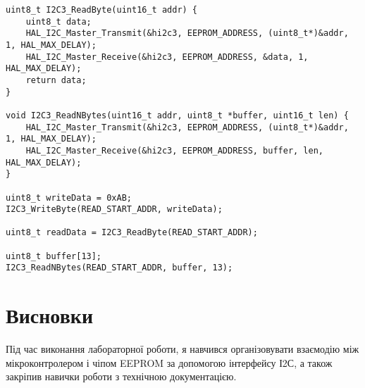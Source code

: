 \documentclass[oneside,14pt]{extarticle}
\begin{document}
\begin{normalsize}
{\begin{lstlisting}
uint8_t I2C3_ReadByte(uint16_t addr) {
    uint8_t data;
    HAL_I2C_Master_Transmit(&hi2c3, EEPROM_ADDRESS, (uint8_t*)&addr, 1, HAL_MAX_DELAY);
    HAL_I2C_Master_Receive(&hi2c3, EEPROM_ADDRESS, &data, 1, HAL_MAX_DELAY);
    return data;
}

void I2C3_ReadNBytes(uint16_t addr, uint8_t *buffer, uint16_t len) {
    HAL_I2C_Master_Transmit(&hi2c3, EEPROM_ADDRESS, (uint8_t*)&addr, 1, HAL_MAX_DELAY);
    HAL_I2C_Master_Receive(&hi2c3, EEPROM_ADDRESS, buffer, len, HAL_MAX_DELAY);
}
	
uint8_t writeData = 0xAB;
I2C3_WriteByte(READ_START_ADDR, writeData);

uint8_t readData = I2C3_ReadByte(READ_START_ADDR);

uint8_t buffer[13];
I2C3_ReadNBytes(READ_START_ADDR, buffer, 13);\end{lstlisting}}
	
	\section*{Висновки}
	Під час виконання лабораторної роботи, я навчився організовувати взаємодію між мікроконтролером і чіпом EEPROM за допомогою інтерфейсу І2С, а також закріпив навички роботи з технічною документацією.
	    
\end{normalsize}
\end{document}
